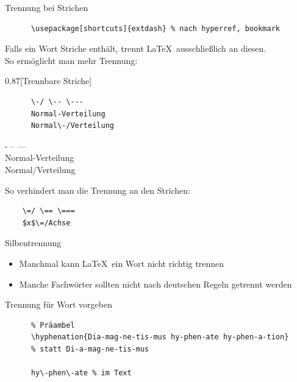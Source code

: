 \begin{frame}[fragile]{Trennung bei Strichen}
  \vspace*{-2em}
  \begin{Packages}
    \begin{lstlisting}
      \usepackage[shortcuts]{extdash} % nach hyperref, bookmark
    \end{lstlisting}
  \end{Packages}

  Falls ein Wort Striche enthält, trennt \LaTeX\ ausschließlich an diesen.\\
  So ermöglicht man mehr Trennung:
  \vspace{-0.5em}
  \begin{CodeExample}{0.87}[Trennbare Striche]
    \begin{lstlisting}
      \-/ \-- \---
      Normal-Verteilung
      Normal\-/Verteilung
    \end{lstlisting}
  \CodeResult
    \strut
    - -- --- \\
    Normal-Verteilung \\
    Normal\-/Verteilung
  \end{CodeExample}

  So verhindert man die Trennung an den Strichen:
  \begin{lstlisting}
    \=/ \== \===
    $x$\=/Achse
  \end{lstlisting}
\end{frame}

\begin{frame}[fragile]{Silbentrennung}
  \begin{itemize}
    \item Manchmal kann \LaTeX\ ein Wort nicht richtig trennen
    \item Manche Fachwörter sollten nicht nach deutschen Regeln getrennt werden
  \end{itemize}
  \begin{block}{Trennung für Wort vorgeben}
    \begin{lstlisting}
      % Präambel
      \hyphenation{Dia-mag-ne-tis-mus hy-phen-ate hy-phen-a-tion}
      % statt Di-a-mag-ne-tis-mus

      hy\-phen\-ate % im Text
    \end{lstlisting}
  \end{block}
\end{frame}
